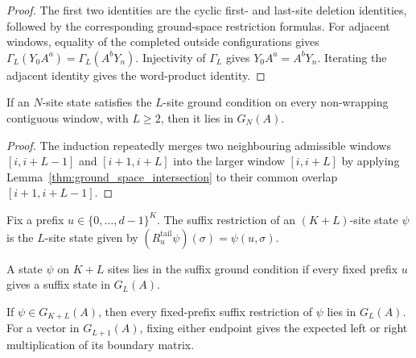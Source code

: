 \begin{proof}
    \leanok
    The first two identities are the cyclic first- and last-site deletion
    identities, followed by the corresponding ground-space restriction
    formulas. For adjacent windows, equality of the completed outside
    configurations gives
    $\Gamma_L(Y_0A^a)=\Gamma_L(A^bY_n)$. Injectivity of $\Gamma_L$ gives
    $Y_0A^a=A^bY_n$. Iterating the adjacent identity gives the word-product
    identity.
\end{proof}

\begin{lemma}\label{lem:contiguous_mem_ground_space}
    \leanok
    If an $N$-site state satisfies the $L$-site ground condition on every
    non-wrapping contiguous window, with $L \ge 2$, then it lies in $G_N(A)$.
\end{lemma}

\begin{proof}
    \leanok
    The induction repeatedly merges two neighbouring admissible windows
    $[i,i+L-1]$ and $[i+1,i+L]$ into the larger window $[i,i+L]$ by applying
    Lemma~\ref{thm:ground_space_intersection} to their common overlap
    $[i+1,i+L-1]$.
\end{proof}

\begin{definition}\label{def:tail_restrict_parent}
    \leanok
    Fix a prefix $u\in\{0,\ldots,d-1\}^K$. The suffix restriction of an
    $(K+L)$-site state $\psi$ is the $L$-site state given by
    $(R^{\mathrm{tail}}_u\psi)(\sigma)=\psi(u,\sigma)$.
\end{definition}

\begin{definition}\label{def:in_tail_ground}
    \leanok
    A state $\psi$ on $K+L$ sites lies in the suffix ground condition if every
    fixed prefix $u$ gives a suffix state in $G_L(A)$.
\end{definition}

\begin{lemma}\label{lem:ground_space_in_tail_ground}
    \leanok
    If $\psi \in G_{K+L}(A)$, then every fixed-prefix suffix restriction of
    $\psi$ lies in $G_L(A)$. For a vector in $G_{L+1}(A)$, fixing either
    endpoint gives the expected left or right multiplication of its boundary
    matrix.
\end{lemma}

